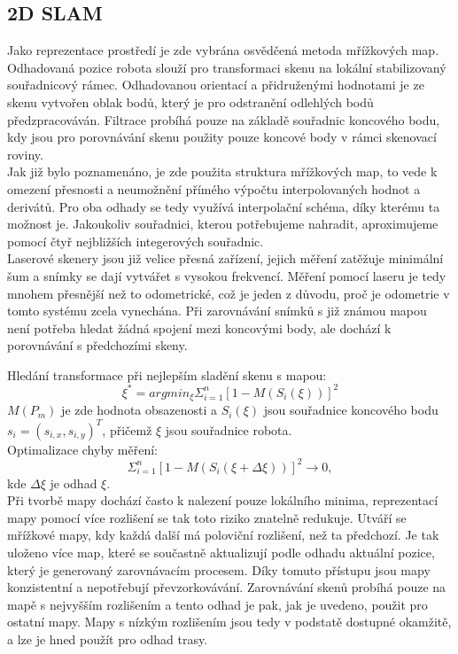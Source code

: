 \documentclass[11pt]{article}
\begin{document}
\subsection{2D SLAM}
Jako reprezentace prostředí je zde vybrána osvědčená metoda mřížkových map. Odhadovaná pozice robota slouží pro transformaci skenu na lokální stabilizovaný souřadnicový rámec. Odhadovanou orientací a přidruženými hodnotami je ze skenu vytvořen oblak bodů, který je pro odstranění odlehlých bodů předzpracováván. Filtrace probíhá pouze na základě souřadnic koncového bodu, kdy jsou pro porovnávání skenu použity pouze koncové body v rámci skenovací roviny.\\
\indent Jak již bylo poznamenáno, je zde použita struktura mřížkových map, to vede k omezení přesnosti a neumožnění přímého výpočtu interpolovaných hodnot a derivátů. Pro oba odhady se tedy využívá interpolační schéma, díky kterému ta možnost je. Jakoukoliv souřadnici, kterou potřebujeme nahradit, aproximujeme pomocí čtyř nejbližších integerových souřadnic. \\
\indent Laserové skenery jsou již velice přesná zařízení, jejich měření zatěžuje minimální šum a snímky se dají vytvářet s vysokou frekvencí. Měření pomocí laseru je tedy mnohem přesnější než to odometrické, což je jeden z důvodu, proč je odometrie v tomto systému zcela vynechána. Při zarovnávání snímků s již známou mapou není potřeba hledat žádná spojení mezi koncovými body, ale dochází k porovnávání s předchozími skeny.  

Hledání transformace při nejlepším sladění skenu s mapou:
\begin{equation}
	\xi^*=argmin_\xi\Sigma_{i=1}^n[1-M(S_i(\xi))]^2
\end{equation}
$M(P_m)$ je zde hodnota obsazenosti a $S_i(\xi)$ jsou souřadnice koncového bodu $s_i=(s_{i,x},s_{i,y})^T$, přičemž $\xi$ jsou souřadnice robota.\\
 
Optimalizace chyby měření: 
\begin{equation}
	\Sigma_{i=1}^n[1-M(S_i(\xi+\Delta\xi))]^2\rightarrow 0,
\end{equation}
kde $\Delta\xi$ je odhad $\xi$.\\
\indent Při tvorbě mapy dochází často k nalezení pouze lokálního minima, reprezentací mapy pomocí více rozlišení se tak toto riziko znatelně redukuje. Utváří se mřížkové mapy, kdy každá další má poloviční rozlišení, než ta předchozí. Je tak uloženo více map, které se součastně aktualizují podle odhadu aktuální pozice, který je generovaný zarovnávacím procesem. Díky tomuto přístupu jsou mapy konzistentní a nepotřebují převzorkovávání. Zarovnávání skenů probíhá pouze na mapě s nejvyšším rozlišením a tento odhad je pak, jak je uvedeno, použit pro ostatní mapy. Mapy s nízkým rozlišením jsou tedy v podstatě dostupné okamžitě, a lze je hned použít pro odhad trasy. 
\end{document}
